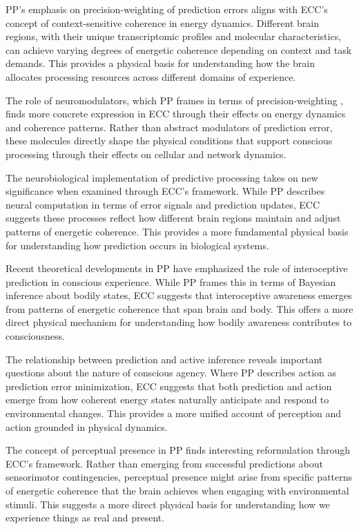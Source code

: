 PP's emphasis on precision-weighting of prediction errors \cite{Hohwy2008} aligns with ECC's concept of context-sensitive coherence in energy dynamics. Different brain regions, with their unique transcriptomic profiles and molecular characteristics, can achieve varying degrees of energetic coherence depending on context and task demands. This provides a physical basis for understanding how the brain allocates processing resources across different domains of experience.

The role of neuromodulators, which PP frames in terms of precision-weighting \cite{Seth2014}, finds more concrete expression in ECC through their effects on energy dynamics and coherence patterns. Rather than abstract modulators of prediction error, these molecules directly shape the physical conditions that support conscious processing through their effects on cellular and network dynamics.

The neurobiological implementation of predictive processing \cite{Rao1999} takes on new significance when examined through ECC's framework. While PP describes neural computation in terms of error signals and prediction updates, ECC suggests these processes reflect how different brain regions maintain and adjust patterns of energetic coherence. This provides a more fundamental physical basis for understanding how prediction occurs in biological systems.

Recent theoretical developments in PP \cite{Seth2012} have emphasized the role of interoceptive prediction in conscious experience. While PP frames this in terms of Bayesian inference about bodily states, ECC suggests that interoceptive awareness emerges from patterns of energetic coherence that span brain and body. This offers a more direct physical mechanism for understanding how bodily awareness contributes to consciousness.

The relationship between prediction and active inference \cite{Seth2016} reveals important questions about the nature of conscious agency. Where PP describes action as prediction error minimization, ECC suggests that both prediction and action emerge from how coherent energy states naturally anticipate and respond to environmental changes. This provides a more unified account of perception and action grounded in physical dynamics.

The concept of perceptual presence in PP \cite{Seth2014} finds interesting reformulation through ECC's framework. Rather than emerging from successful predictions about sensorimotor contingencies, perceptual presence might arise from specific patterns of energetic coherence that the brain achieves when engaging with environmental stimuli. This suggests a more direct physical basis for understanding how we experience things as real and present.

